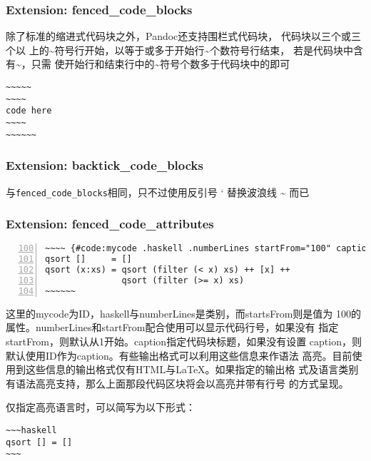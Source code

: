 \documentclass[fancyhdr,bookmark]{ctexbook}
\begin{document}
\subsubsection{Extension:
fenced\_code\_blocks}\label{extension-fenced_code_blocks}

除了标准的缩进式代码块之外，Pandoc还支持围栏式代码块，
代码块以三个或三个以
上的\textasciitilde{}符号行开始，以等于或多于开始行\textasciitilde{}个数符号行结束，
若是代码块中含有\textasciitilde{}，只需
使开始行和结束行中的\textasciitilde{}符号个数多于代码块中的即可

\begin{lstlisting}
~~~~~
~~~~
code here
~~~~
~~~~~~
\end{lstlisting}

\subsubsection{Extension:
backtick\_code\_blocks}\label{extension-backtick_code_blocks}

与\lstinline!fenced_code_blocks!相同，只不过使用反引号 ` 替换波浪线
\textasciitilde{} 而已

\subsubsection{Extension:
fenced\_code\_attributes}\label{extension-fenced_code_attributes}

\begin{lstlisting}[numbers=left, firstnumber=100, caption=围栏式代码块, label=code:fencedcode, float=htbp]
~~~~ {#code:mycode .haskell .numberLines startFrom="100" caption="围栏式代码块"}
qsort []     = []
qsort (x:xs) = qsort (filter (< x) xs) ++ [x] ++
               qsort (filter (>= x) xs)
~~~~~~
\end{lstlisting}

这里的mycode为ID，haskell与numberLines是类别，而startsFrom则是值为
100的属性。numberLines和startFrom配合使用可以显示代码行号，如果没有
指定startFrom，则默认从1开始。caption指定代码块标题，如果没有设置
caption，则默认使用ID作为caption。有些输出格式可以利用这些信息来作语法
高亮。目前使用到这些信息的输出格式仅有HTML与LaTeX。如果指定的输出格
式及语言类别有语法高亮支持，那么上面那段代码区块将会以高亮并带有行号
的方式呈现。

仅指定高亮语言时，可以简写为以下形式：

\begin{lstlisting}
~~~haskell
qsort [] = []
~~~
\end{lstlisting}
\end{document}
